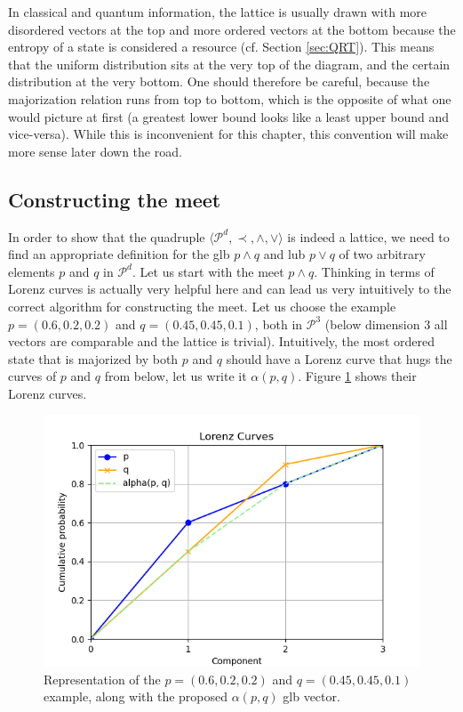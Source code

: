 In classical and quantum information, the lattice is usually drawn with more disordered vectors at the top and more ordered vectors at the bottom because the entropy of a state is considered a resource (cf. Section \ref{sec:QRT}). This means that the uniform distribution sits at the very top of the diagram, and the certain distribution at the very bottom. One should therefore be careful, because the majorization relation runs from top to bottom, which is the opposite of what one would picture at first (a greatest lower bound looks like a least upper bound and vice-versa). While this is inconvenient for this chapter, this convention will make more sense later down the road.



\subsection{Constructing the meet} \label{sec:meet}

In order to show that the quadruple $\langle \mathcal{P}^d, \prec, \wedge, \vee \rangle$ is indeed a lattice, we need to find an appropriate definition for the glb $p \wedge q$ and lub $p \vee q$ of two arbitrary elements $p$ and $q$ in $\mathcal{P}^d$. Let us start with the meet $p \wedge q$. Thinking in terms of Lorenz curves is actually very helpful here and can lead us very intuitively to the correct algorithm for constructing the meet. Let us choose the example $p = (0.6, 0.2, 0.2)$ and $q = (0.45, 0.45, 0.1)$, both in $\mathcal{P}^3$ (below dimension 3 all vectors are comparable and the lattice is trivial). Intuitively, the most ordered state that is majorized by both $p$ and $q$ should have a Lorenz curve that hugs the curves of $p$ and $q$ from below, let us write it $\alpha(p, q)$. Figure \ref{fig:meet_attempt} shows their Lorenz curves.

\begin{figure}[h!]
    \centering
    \includegraphics[scale=0.6]{images/meet_intuition.png}
    \caption{Representation of the $p = (0.6, 0.2, 0.2)$ and $q = (0.45, 0.45, 0.1)$ example, along with the proposed $\alpha(p, q)$ glb vector.} \label{fig:meet_attempt}
\end{figure}

